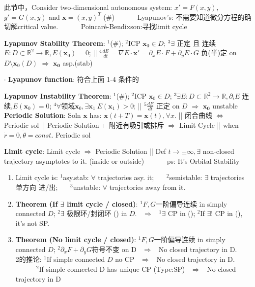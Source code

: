 \documentclass[8pt]{extarticle}
\begin{document}
\vspace{-2pt}
{\tiny * 此节中，Consider two-dimensional autonomous system: $x'=F(x,y)$, $y'=G(x,y)$ and $\mathbf{x}=(x,y)^T$ (\#) \ \ \ \ \ \ Lyapunov's: 不需要知道微分方程的确切解critical value. \ \ \ \ \ \ Poincaré-Bendixson:寻找limit cycle}
\vspace{-2pt}

\begin{minipage}[t]{0.71\textwidth}

    \textbf{Lyapunov Stability Theorem}: {\scriptsize $^1$(\#); $^2$ICP $\mathbf{x}_0\in D$; $^3\exists$ 正定 且 连续 $ E:D\subset\mathbb{R}^2\to\mathbb{R},E(\mathbf{x}_0)=0$; || $^4\frac{dE}{dt}=\nabla E\cdot\mathbf{x}'=\partial_x E\cdot F+\partial_y E\cdot G$ 负(半)定 on $D\setminus\mathbf{x}_0(D)$} $\Rightarrow$ { $\mathbf{x_0}$ asp.(stab)}

    $\cdot$ \textbf{Lyapunov function}: 符合上面 1-4 条件的
    
    \textbf{Lyapunov Instability Theorem}: { $^1$(\#); $^2$ICP $\mathbf{x}_0\in D$; $^3\exists E:D\subset\mathbb{R}^2\to\mathbb{R},\partial_i E$ 连续,$E(\mathbf{x}_0)=0$; $^4\forall${\tiny 领域}$\mathbf{x}_0,\exists\mathbf{x}_1 \ E(\mathbf{x}_1)>0$; || $^5\frac{dE}{dt}$ 正定 on $D$ $\Rightarrow$ $\mathbf{x_0}$ unstable} \\
    
    \textbf{Periodic Solution}: {\scriptsize Soln $\mathbf{x}$ has: $\mathbf{x}(t+T)=\mathbf{x}(t),\forall x$}.  || {\scriptsize 闭合曲线 $\Leftrightarrow$ Periodic sol} || {\scriptsize Periodic Solution + 附近有吸引或排斥 $\Rightarrow$ Limit Cycle} || {\scriptsize when $\dot{r}=0,\dot{\theta}=const.$ Periodic sol}
    
    \textbf{Limit cycle}: {\scriptsize Limit cycle $\Rightarrow$ Periodic Solution} || Def $t\to\pm\infty,\exists$ non-closed trajectory asymptotes to it. {\scriptsize (inside or outside)} \ \ \ \ \ \ {\scriptsize ps: It's Orbital Stability}
    \begin{enumerate}[itemsep=-2pt, topsep=-2pt]
        \item Limit cycle is: $^1$asy.stab: $\forall$ trajectories asy. it; \ \ \ $^2$semistable: $\exists$ trajectories { 单方向 进/出}; \ \ \ $^3$unstable: $\forall$ trajectories away from it.
        \item \textbf{Theorem (If $\exists$ limit cycle / closed)}: { $^1F,G${\scriptsize 一阶偏导连续} in simply connected $D$; $^2\exists$ {\scriptsize 极限环/封闭环} (\star) in $D$. \ $\Rightarrow$ \ $^1\exists$ CP in (\star); $^2$If $\exists!$ CP in (\star), it's not SP}.
        \item \textbf{Theorem (No limit cycle / closed)}: { $^1F,G${\scriptsize 一阶偏导连续} in simply connected $D$; $^2\partial_xF+\partial_yG${\scriptsize 符号不变} on D \ $\Rightarrow$ \ No closed trajectory in D.}
        \\ { 2的推论: $^1$If simple connected $D$ no CP \ $\Rightarrow$ \ No closed trajectory in D. \ \ \ \ \ \ $^2$If simple connected D has unique CP (Type:SP)  \ $\Rightarrow$ \ No closed trajectory in D}
    \end{enumerate}
    

\end{minipage}
\end{document}
